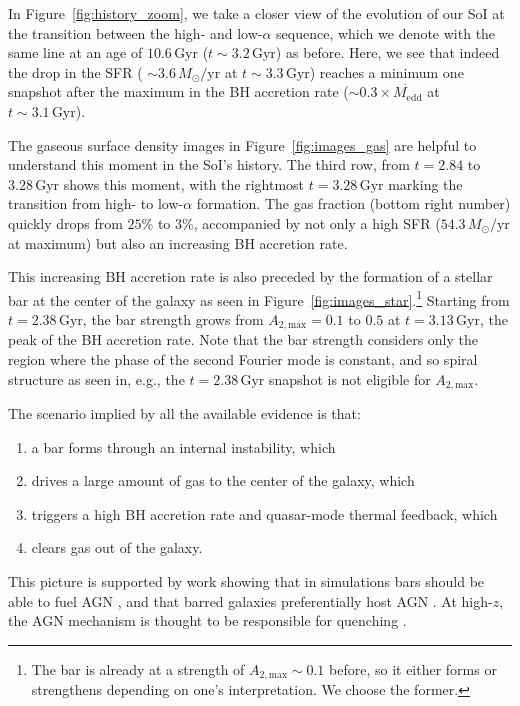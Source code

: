 \documentclass[linenumbers, twocolumn]{aastex631}
\newcommand{\Msun}{\ensuremath{M_{\odot}}}
\newcommand{\Gyr}{\ensuremath{\textrm{Gyr}}}
\newcommand{\Msunyr}{\ensuremath{\Msun/\textrm{yr}}}
\newcommand{\Atmax}{\ensuremath{A_{2,\textrm{max}}}}
\begin{document}
In Figure~\ref{fig:history_zoom}, we take a closer view of the evolution of our SoI at the transition between the high- and low-$\alpha$ sequence, which we denote with the same line at an age of $10.6\,\Gyr$ ($t\sim3.2\,\Gyr$) as before. Here, we see that indeed the drop in the SFR ( $\sim3.6\,\Msunyr$ at $t\sim3.3\,\Gyr$) reaches a minimum one snapshot after the maximum in the BH accretion rate ($\sim0.3\times\dot{M_{\textrm{edd}}}$ at $t\sim3.1\,\Gyr$).

The gaseous surface density images in Figure~\ref{fig:images_gas} are helpful to understand this moment in the SoI's history. The third row, from $t=2.84$ to $3.28\,\Gyr$ shows this moment, with the rightmost $t=3.28\,\Gyr$ marking the transition from high- to low-$\alpha$ formation. The gas fraction (bottom right number) quickly drops from $25\%$ to $3\%$, accompanied by not only a high SFR ($54.3\,\Msunyr$ at maximum) but also an increasing BH accretion rate.

This increasing BH accretion rate is also preceded by the formation of a stellar bar at the center of the galaxy as seen in Figure~\ref{fig:images_star}.\footnote{The bar is already at a strength of $\Atmax\sim0.1$ before, so it either forms or strengthens depending on one's interpretation. We choose the former.} Starting from $t=2.38\,\Gyr$, the bar strength grows from $\Atmax=0.1$ to $0.5$ at $t=3.13\,\Gyr$, the peak of the BH accretion rate. Note that the bar strength considers only the region where the phase of the second Fourier mode is constant, and so spiral structure as seen in, e.g., the $t=2.38\,\Gyr$ snapshot is not eligible for \Atmax{}.

The scenario implied by all the available evidence is that: 
\begin{enumerate}
  \item a bar forms through an internal instability, which
  \item drives a large amount of gas to the center of the galaxy, which
  \item triggers a high BH accretion rate and quasar-mode thermal feedback, which
  \item clears gas out of the galaxy.
\end{enumerate}
This picture is supported by work showing that in simulations bars should be able to fuel AGN \citep{1990Natur.345..679S,2010MNRAS.407.1529H}, and that barred galaxies preferentially host AGN \citep{2022A&A...661A.105S}. At high-$z$, the AGN mechanism is thought to be responsible for quenching \citep[e.g.][and references therein]{2023arXiv230806317D,2024arXiv240417945P,2024arXiv240518685M,2024Natur.630...54B}.
\end{document}
